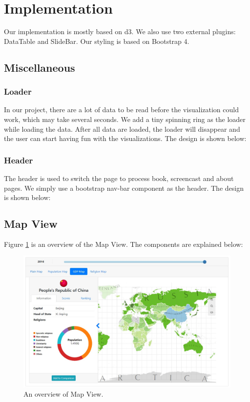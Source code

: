 \documentclass[12pt, fullpage,letterpaper]{article}
\begin{document}
\section{Implementation}
Our implementation is mostly based on d3. We also use two external plugins: DataTable and SlideBar. Our styling is based on Bootstrap 4.
\subsection{Miscellaneous}
\subsubsection{Loader}
In our project, there are a lot of data to be read before the visualization
could work, which may take several seconds.  We add a tiny spinning ring as the loader while loading
the data. After all data are loaded, the loader will disappear and the user can
start having fun with the visualizations.
The design is shown below:
\subsubsection{Header}
The header is used to switch the page to process book, screencast and about pages.
We simply use a bootstrap nav-bar component as the header.
The design is shown below:

\subsection{Map View}
Figure \ref{fig:mapoverview} is an overview of the Map View. The components are explained below:
\begin{figure}[h!]
    \begin{center}
        \includegraphics[width=\textwidth]{figs/mapoverview.jpg}
        \caption{An overview of Map View.}
        \label{fig:mapoverview}
    \end{center}
\end{figure}
\end{document}
